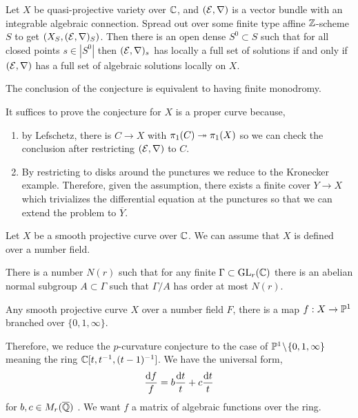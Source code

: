 \documentclass[12pt]{article}
\begin{document}
\begin{conj}[Grothendieck]
Let $X$ be quasi-projective variety over $\CC$, and $(\E, \nabla)$ is a vector bundle with an integrable algebraic connection. Spread out over some finite type affine $\Z$-scheme $S$ to get $(X_S, (\E, \nabla)_S)$. Then there is an open dense $S^0 \subset S$ such that for all closed points $s \in |S^0|$ then $(\E, \nabla)_{s}$ has locally a full set of solutions if and only if $(\E, \nabla)$ has a full set of algebraic solutions locally on $X$. 
\end{conj}

\begin{rmk}
The conclusion of the conjecture is equivalent to having finite monodromy. 
\end{rmk}

\begin{rmk}
It suffices to prove the conjecture for $X$ is a proper curve because,
\begin{enumerate}
\item by Lefschetz, there is $C \to X$ with $\pi_1(C) \onto \pi_1(X)$ so we can check the conclusion after restricting $(\E, \nabla)$ to $C$.
\item By restricting to disks around the punctures we reduce to the Kronecker example. Therefore, given the assumption, there exists a finite \etale cover $Y \to X$ which trivializes the differential equation at the punctures so that we can extend the problem to $\overline{Y}$.
\end{enumerate}
\end{rmk}

\begin{prop}
Let $X$ be a smooth projective curve over $\CC$. We can assume that $X$ is defined over a number field. 
\end{prop}

\begin{prop}[Jordan]
There is a number $N(r)$ such that for any finite $\Gamma \subset \GL_r(\CC)$ there is an abelian normal subgroup $A \subset \Gamma$ such that $\Gamma / A$ has order at most $N(r)$.
\end{prop}

\begin{theorem}[Belyi]
Any smooth projective curve $X$ over a number field $F$, there is a map $f : X \to \P^1$ branched over $\{ 0, 1, \infty \}$. 
\end{theorem}

\begin{cor}
Therefore, we reduce the $p$-curvature conjecture to the case of $\P^1 \sm \{ 0, 1, \infty \}$ meaning the ring $\CC[t, t^{-1}, (t-1)^{-1}]$. We have the universal form,
\[ \frac{\d{f}}{f} = b \frac{\d{t}}{t} + c \frac{\d{t}}{t} \]
for $b, c \in M_r(\overline{\Q})$ . We want $f$ a matrix of algebraic functions over the ring. 
\end{cor}
\end{document}
